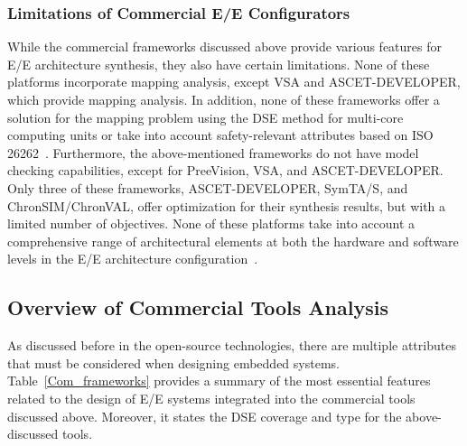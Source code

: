 \subsubsection{Limitations of Commercial E/E Configurators}

While the commercial frameworks discussed above provide various features for E/E architecture synthesis, they also have certain limitations. None of these platforms incorporate mapping analysis, except VSA and ASCET-DEVELOPER, which provide mapping analysis. In addition, none of these frameworks offer a solution for the mapping problem using the DSE method for multi-core computing units or take into account safety-relevant attributes based on ISO 26262~\cite{iso26262}.
Furthermore, the above-mentioned frameworks do not have model checking capabilities, except for PreeVision, VSA, and ASCET-DEVELOPER. Only three of these frameworks, ASCET-DEVELOPER, SymTA/S, and ChronSIM/ChronVAL, offer optimization for their synthesis results, but with a limited number of objectives. None of these platforms take into account a comprehensive range of architectural elements at both the hardware and software levels in the E/E architecture configuration~\cite{askaripoor2022architecture}.




\subsection{Overview of Commercial Tools Analysis}

As discussed before in the open-source technologies, there are multiple attributes that must be considered when designing embedded systems. Table~\ref{Com_frameworks} provides a summary of the most essential features related to the design of E/E systems integrated into the commercial tools discussed above. 
Moreover, it states the DSE coverage and type for the above-discussed tools.

